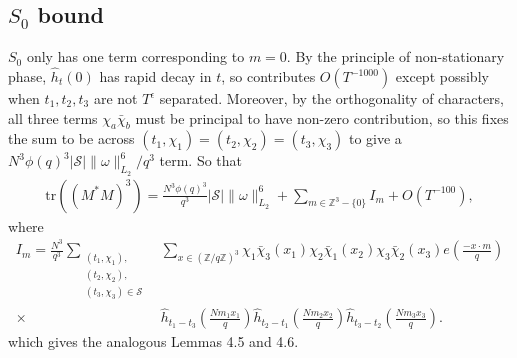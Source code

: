 \subsection{$S_0$ bound}
$S_0$ only has one term corresponding to $m=0$. By the principle of non-stationary phase, $\hat{h}_t(0)$ has rapid decay in $t$, so contributes $O(T^{-1000})$ except possibly when $t_1,t_2,t_3$ are not $T^\epsilon$ separated.
Moreover, by the orthogonality of characters, all three terms $\chi_a\bar{\chi}_b$ must be principal to have non-zero contribution,
so this fixes the sum to be across $(t_1,\chi_1)=(t_2,\chi_2)=(t_3,\chi_3)$ to give a $N^3\phi(q)^3|\mathcal{S}|\|\omega\|_{L_2}^6/q^3$ term.
So that \begin{align*}
    \textrm{tr}((M^*M)^3)=\frac{N^3\phi(q)^3}{q^3}|\mathcal{S}|\|\omega\|_{L_2}^6 + \sum_{m\in\mathbb{Z}^3 - \{0\}} I_m + O(T^{-100}),
\end{align*}
where \begin{align*}
    I_m=\frac{N^3}{q^3}\sum_{\substack{(t_1,\chi_1),\\(t_2,\chi_2),\\(t_3,\chi_3)\in\mathcal{S}}} &\sum_{x\in (\mathbb{Z}/q\mathbb{Z})^3}\chi_1\bar{\chi}_3(x_1)\chi_2\bar{\chi}_1(x_2)\chi_3\bar{\chi}_2(x_3) e\left(\frac{-x\cdot m}{q}\right)\\
    \times \ &\hat{h}_{t_1-t_3}\left(\frac{Nm_1x_1}{q}\right)\hat{h}_{t_2-t_1}\left(\frac{Nm_2x_2}{q}\right)\hat{h}_{t_3-t_2}\left(\frac{Nm_3x_3}{q}\right).
\end{align*}
which gives the analogous Lemmas 4.5 and 4.6.
